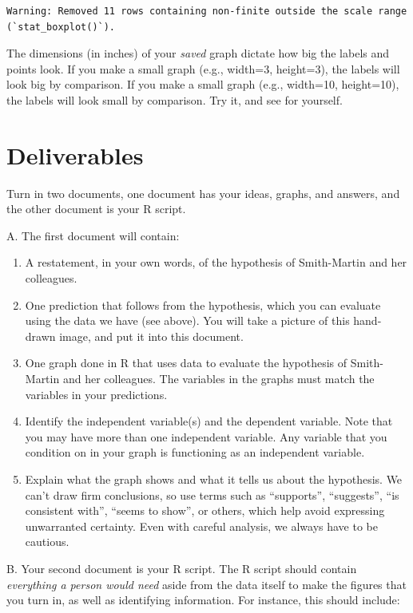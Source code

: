 \documentclass[
  letterpaper,
  DIV=11,
  numbers=noendperiod]{scrreprt}
\providecommand{\tightlist}{%
  \setlength{\itemsep}{0pt}\setlength{\parskip}{0pt}}
\begin{document}
\begin{verbatim}
Warning: Removed 11 rows containing non-finite outside the scale range
(`stat_boxplot()`).
\end{verbatim}

The dimensions (in inches) of your \emph{saved} graph dictate how big
the labels and points look. If you make a small graph (e.g., width=3,
height=3), the labels will look big by comparison. If you make a small
graph (e.g., width=10, height=10), the labels will look small by
comparison. Try it, and see for yourself.

\section{Deliverables}\label{deliverables-4}

Turn in two documents, one document has your ideas, graphs, and answers,
and the other document is your R script.

A. The first document will contain:

\begin{enumerate}
\def\labelenumi{\arabic{enumi}.}
\tightlist
\item
  A restatement, in your own words, of the hypothesis of Smith-Martin
  and her colleagues.
\item
  One prediction that follows from the hypothesis, which you can
  evaluate using the data we have (see above). You will take a picture
  of this hand-drawn image, and put it into this document.
\item
  One graph done in R that uses data to evaluate the hypothesis of
  Smith-Martin and her colleagues. The variables in the graphs must
  match the variables in your predictions.
\item
  Identify the independent variable(s) and the dependent variable. Note
  that you may have more than one independent variable. Any variable
  that you condition on in your graph is functioning as an independent
  variable.
\item
  Explain what the graph shows and what it tells us about the
  hypothesis. We can't draw firm conclusions, so use terms such as
  ``supports'', ``suggests'', ``is consistent with'', ``seems to show'',
  or others, which help avoid expressing unwarranted certainty. Even
  with careful analysis, we always have to be cautious.
\end{enumerate}

B. Your second document is your R script. The R script should contain
\emph{everything a person would need} aside from the data itself to make
the figures that you turn in, as well as identifying information. For
instance, this should include:
\end{document}
